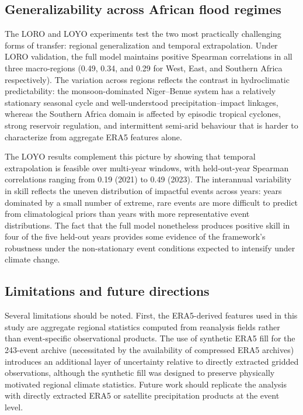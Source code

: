\documentclass[pdflatex,sn-mathphys-ay]{sn-jnl}
\theoremstyle{thmstyleone}
\theoremstyle{thmstylethree}
\theoremstyle{thmstyletwo}
\begin{document}
\subsection{Generalizability across African flood regimes}

The LORO and LOYO experiments test the two most practically
challenging forms of transfer: regional generalization and temporal
extrapolation.  Under LORO validation, the full model maintains
positive Spearman correlations in all three macro-regions (0.49,
0.34, and 0.29 for West, East, and Southern Africa respectively).
The variation across regions reflects the contrast in hydroclimatic
predictability: the monsoon-dominated Niger--Benue system has a
relatively stationary seasonal cycle and well-understood
precipitation--impact linkages, whereas the Southern Africa domain
is affected by episodic tropical cyclones, strong reservoir
regulation, and intermittent semi-arid behaviour that is harder to
characterize from aggregate ERA5 features alone.

The LOYO results complement this picture by showing that temporal
extrapolation is feasible over multi-year windows, with held-out-year
Spearman correlations ranging from 0.19 (2021) to 0.49 (2023).
The interannual variability in skill reflects the uneven distribution
of impactful events across years: years dominated by a small number
of extreme, rare events are more difficult to predict from
climatological priors than years with more representative event
distributions.  The fact that the full model nonetheless produces
positive skill in four of the five held-out years provides some
evidence of the framework's robustness under the non-stationary
event conditions expected to intensify under climate change.

\subsection{Limitations and future directions}

Several limitations should be noted.  First, the ERA5-derived
features used in this study are aggregate regional statistics
computed from reanalysis fields rather than event-specific
observational products.  The use of synthetic ERA5 fill for the
243-event archive (necessitated by the availability of compressed
ERA5 archives) introduces an additional layer of uncertainty relative
to directly extracted gridded observations, although the synthetic
fill was designed to preserve physically motivated regional
climate statistics.  Future work should replicate the analysis
with directly extracted ERA5 or satellite precipitation products at
the event level.
\end{document}
